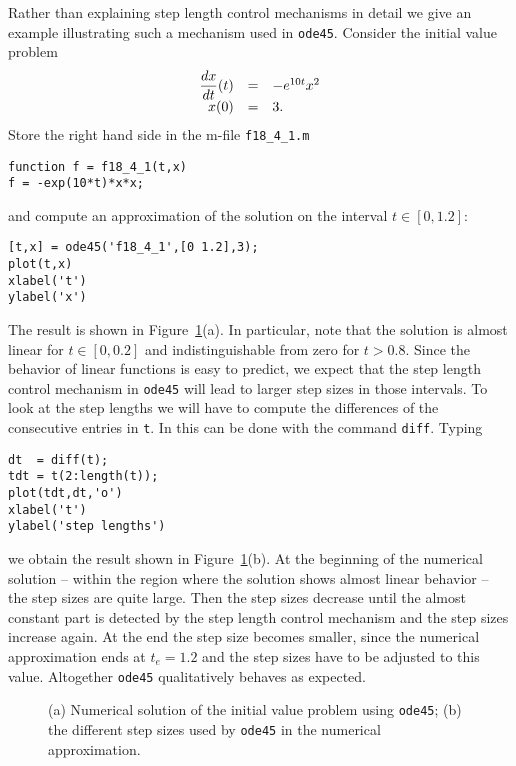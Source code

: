 \documentclass{ximera}
\begin{document}
Rather than explaining step length control mechanisms in detail
we give an example illustrating such a mechanism used in
{\tt ode45}.  Consider the initial value problem
\arraystart
\begin{equation*}  \label{eq:odestepivp}
\begin{array}{rcl}
\displaystyle \frac{dx}{dt}(t) & = & -e^{10t}x^2 \\
 x(0) & = & 3.
\end{array}
\end{equation*}
\arrayfinish
Store the right hand side in the m-file {\tt f18\_4\_1.m}
\begin{verbatim}
function f = f18_4_1(t,x)
f = -exp(10*t)*x*x;
\end{verbatim}
and compute an approximation of the solution on the interval
$t\in[0,1.2]$:
\begin{verbatim}
[t,x] = ode45('f18_4_1',[0 1.2],3);
plot(t,x)
xlabel('t')
ylabel('x')
\end{verbatim}
The result is shown in Figure~\ref{fig:ode45step}(a).
In particular, note that the solution is almost linear
for $t\in[0,0.2]$ and indistinguishable from zero for $t>0.8$.
Since the behavior of linear functions is easy to predict, we expect
that the step length control
mechanism in {\tt ode45} will lead
to larger step sizes in those intervals.  To look at the step
lengths we will have to compute the differences of the consecutive
entries in {\tt t}.  In \Matlab this can be done with the
command {\tt diff}.  Typing
\begin{verbatim}
dt  = diff(t);
tdt = t(2:length(t));
plot(tdt,dt,'o')
xlabel('t')
ylabel('step lengths')
\end{verbatim}
we obtain the result shown in Figure~\ref{fig:ode45step}(b).
At the beginning of the numerical solution -- within the region
where the solution shows almost linear behavior -- the step sizes
are quite large. Then the step sizes decrease until the almost constant
part is detected by the step length control mechanism and the step
sizes increase again.
At the end the step size becomes smaller, since  the
numerical approximation ends at $t_e = 1.2$ and
the step sizes have to be adjusted to this value.
Altogether {\tt ode45}
qualitatively behaves as expected.

\begin{figure}[htb]
   \centerline{%
   }
   \caption{(a) Numerical solution of the initial value problem
   \protect{} using {\tt ode45};
   (b) the different step sizes used by {\tt ode45} in
   the numerical approximation.}
   \label{fig:ode45step}
\end{figure}
\end{document}
